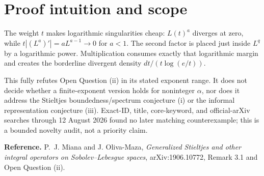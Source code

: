 \documentclass[11pt]{article}
\begin{document}
\section*{Proof intuition and scope}

The weight $t$ makes logarithmic singularities cheap: $L(t)^a$ diverges at
zero, while $t|(L^a)'|=aL^{a-1}\to0$ for $a<1$.  The second factor is placed
just inside $L^q$ by a logarithmic power.  Multiplication consumes exactly
that logarithmic margin and creates the borderline divergent density
$dt/(t\log(e/t))$.

This fully refutes Open Question (ii) in its stated exponent range.  It does
not decide whether a finite-exponent version holds for noninteger $\alpha$,
nor does it address the Stieltjes boundedness/spectrum conjecture (i) or the
informal representation conjecture (iii).  Exact-ID, title, core-keyword,
and official-arXiv searches through 12 August 2026 found no later matching
counterexample; this is a bounded novelty audit, not a priority claim.

{\small
\textbf{Reference.}
P.~J. Miana and J. Oliva-Maza, \emph{Generalized Stieltjes and other integral
operators on Sobolev--Lebesgue spaces}, arXiv:1906.10772, Remark 3.1 and
Open Question (ii).
}
\end{document}
